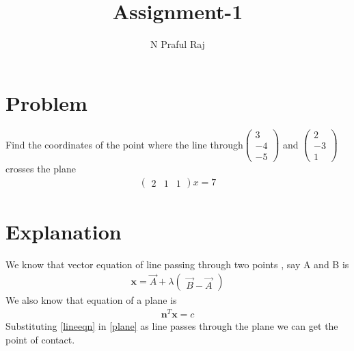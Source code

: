 \documentclass[10pt,a4paper,twocolumn]{article}
\author{N Praful Raj}
\title{\textbf{Assignment-1}}
\numberwithin{equation}{section}
\begin{document}
\maketitle



	
\section{Problem}
Find the coordinates of the point where the line through$\begin{pmatrix}3 \\-4 \\-5\end{pmatrix}$ and $\begin{pmatrix}2 \\-3 \\1\end{pmatrix}$ crosses the plane \begin{align}\begin{pmatrix}2 & 1 & 1\end{pmatrix}x=7 \end{align}

\section{Explanation}\label{exp}
We know that vector equation of line passing through two points , say A and B is
\begin{gather}\label{lineeqn}\textbf{x} = \vec{A}+\lambda\begin{pmatrix}\vec{B}-\vec{A}\end{pmatrix}
\end{gather}
We also know that equation of a plane is \begin{gather}\label{plane}\textbf{n}^T\textbf{x}=c\end{gather}
Substituting \ref{lineeqn} in \ref{plane} as line passes through the plane we can get the point of contact.
\end{document}
